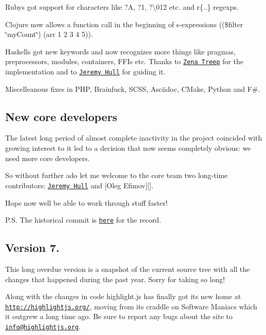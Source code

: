 \begin{DoxyItemize}
\item Ruby\textquotesingle{}s got support for characters like {\ttfamily ?A}, {\ttfamily ?1}, {\ttfamily ?\textbackslash{}012} etc. and {\ttfamily r\{..\}} regexps.
\item Clojure now allows a function call in the beginning of s-\/expressions {\ttfamily ((\$filter \char`\"{}my\+Count\char`\"{}) (arr 1 2 3 4 5))}.
\item Haskell\textquotesingle{}s got new keywords and now recognizes more things like pragmas, preprocessors, modules, containers, F\+F\+Is etc. Thanks to \href{https://github.com/treep}{\tt Zena Treep} for the implementation and to \href{https://github.com/sourrust}{\tt Jeremy Hull} for guiding it.
\item Miscelleanous fixes in P\+HP, Brainfuck, S\+C\+SS, Asciidoc, C\+Make, Python and F\#.
\end{DoxyItemize}

\subsection*{New core developers}

The latest long period of almost complete inactivity in the project coincided with growing interest to it led to a decision that now seems completely obvious\+: we need more core developers.

So without further ado let me welcome to the core team two long-\/time contributors\+: \href{https://github.com/sourrust}{\tt Jeremy Hull} and \mbox{[}Oleg Efimov\mbox{]}\mbox{[}\mbox{]}.

Hope now we\textquotesingle{}ll be able to work through stuff faster!

P.\+S. The historical commit is \href{http://roudakov.ru/}{\tt here} for the record.

\subsection*{Version 7.}

This long overdue version is a snapshot of the current source tree with all the changes that happened during the past year. Sorry for taking so long!

Along with the changes in code highlight.\+js has finally got its new home at \href{http://highlightjs.org/}{\tt http\+://highlightjs.\+org/}, moving from its craddle on Software Maniacs which it outgrew a long time ago. Be sure to report any bugs about the site to \href{mailto:info@highlightjs.org}{\tt info@highlightjs.\+org}.

